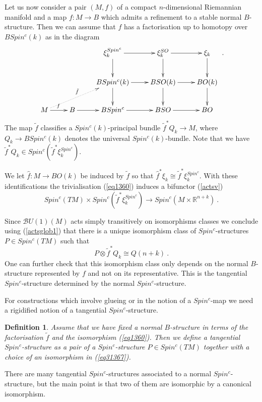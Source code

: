 \documentclass[12pt]{article}
\newtheorem{ddd}[theorem]{Definition}
\newcommand{\cB}{{\mathcal{B}}}
\newcommand{\R}{{\mathbb{R}}}
\begin{document}
Let us now consider a pair $(M,f)$ of a compact   $n$-dimensional Riemannian manifold   and a map $f:M\to B$ which admits a refinement to a stable normal $B$-structure.
  Then we can assume that $f$ has a factorisation up to homotopy over $BSpin^{c}(k)$ as in the diagram
\begin{equation}\label{fakdia}\xymatrix{&&\xi_{k}^{Spin^{c}}\ar[r]\ar[d]&\xi_{k}^{SO}\ar[r]\ar[d]&\xi_{k}\ar[d]\\&&BSpin^{c}(k)\ar[r]\ar[d]&BSO(k)\ar[d]\ar[r]&BO(k)\ar[d]\\M\ar@{.>}[urr]^{\tilde f}  
\ar[r]^{f}&B\ar[r]&BSpin^{c}\ar[r]&BSO\ar[r]&BO}\ .\end{equation} The map $\tilde f$ classifies a
$Spin^{c}(k)$-principal bundle $\tilde f^{*}Q_{k}\to M$, where $Q_{k}\to BSpin^{c}(k)$ denotes the universal $Spin^{c}(k)$-bundle. Note that we have $\tilde f^{*}Q_{k}\in Spin^{c}( \tilde f^{*}\xi^{Spin^{c}}_{k})$. 

We let $\hat f:M\to BO(k)$ be induced by $\tilde f$ so that $\hat f^{*}\xi_k\cong \tilde f^{*}\xi_{k}^{Spin^{c}} $. With these identifications
the trivialisation (\ref{eq1360}) induces a bifunctor (\ref{actsv})
$$Spin^{c}(TM)\times Spin^{c}(\tilde f^{*}\xi^{Spin^{c}}_{k})\to Spin^{c}(M\times \R^{n+k})\ .$$

Since $\cB U(1)(M)$ acts simply transitively on isomorphisms classes
we conclude using (\ref{actsglob1}) that there is a unique isomorphism class of $Spin^{c}$-structures
$P\in Spin^{c}(TM)$ such that
\begin{equation}\label{eq31367}
P\otimes \tilde f^{*}Q_{k}\cong Q(n+k)\ .\end{equation} One can further check that this
isomorphism class only depends on the normal $B$-structure represented by $f$ and not on its representative. This is the tangential $Spin^{c}$-structure determined by the normal $Spin^{c}$-structure.

For constructions which involve glueing or in the notion of a $Spin^{c}$-map we need a rigidified notion of a tangential $Spin^{c}$-structure.  
\begin{ddd}\label{tang}
Assume that we have fixed a  normal $B$-structure in terms of the factorisation $\tilde f$ and the isomorphism  (\ref{eq1360}). Then we define a tangential  $Spin^{c}$-structure as a pair of a 
$Spin^{c}$-structure $P\in Spin^{c}(TM)$ together with a choice of an isomorphism in (\ref{eq31367}).
\end{ddd}
There are many tangential $Spin^{c}$-structures  associated to a  normal $Spin^{c}$-structure, but the main point is that two of them are isomorphic by a canonical isomorphism.
\end{document}
